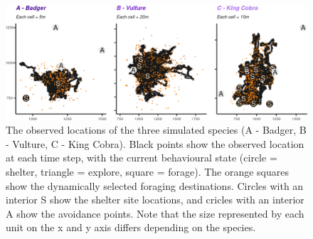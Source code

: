 \documentclass[10pt,a4paper]{article}
\begin{document}
\begin{figure}

{\centering \includegraphics{Agent-based_model_walkthrough_files/figure-latex/mapsFigure-1} 

}

\caption{The observed locations of the three simulated species (A - Badger, B - Vulture, C - King Cobra). Black points show the observed location at each time step, with the current behavioural state (circle = shelter, triangle = explore, square = forage). The orange squares show the dynamically selected foraging destinations. Circles with an interior S show the shelter site locations, and cricles with an interior A show the avoidance points. Note that the size represented by each unit on the x and y axis differs depending on the species.}\label{fig:mapsFigure}
\end{figure}
\end{document}
